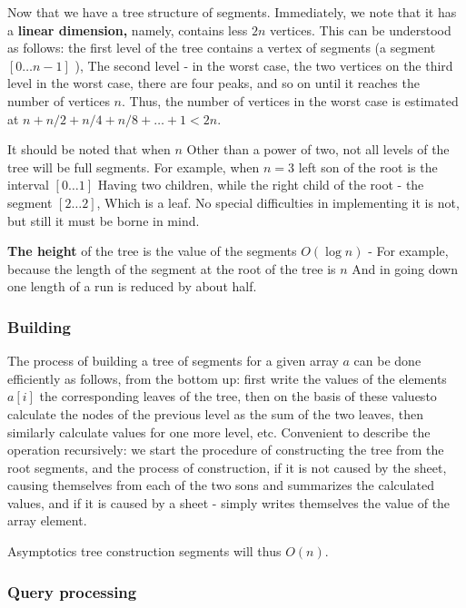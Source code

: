 Now that we have a tree structure of segments. Immediately, we note that it has a \textbf{linear dimension,} namely, contains less $2n$ vertices. This can be understood as follows: the first level of the tree contains a vertex of segments (a segment $[0 \ldots n-1]$ ), The second level - in the worst case, the two vertices on the third level in the worst case, there are four peaks, and so on until it reaches the number of vertices $n$. Thus, the number of vertices in the worst case is estimated at $n + n / 2 + n / 4 + n / 8 + \ldots + 1 <2n$.

It should be noted that when $n$ Other than a power of two, not all levels of the tree will be full segments. For example, when $n = 3$ left son of the root is the interval $[0 \ldots 1]$ Having two children, while the right child of the root - the segment $[2 \ldots 2]$, Which is a leaf. No special difficulties in implementing it is not, but still it must be borne in mind.

\textbf{The height} of the tree is the value of the segments $O (\log n)$ - For example, because the length of the segment at the root of the tree is $n$ And in going down one length of a run is reduced by about half.

\subsubsection{ Building }

The process of building a tree of segments for a given array $a$ can be done efficiently as follows, from the bottom up: first write the values ​​of the elements $a [i]$ the corresponding leaves of the tree, then on the basis of these values ​​to calculate the nodes of the previous level as the sum of the two leaves, then similarly calculate values ​​for one more level, etc. Convenient to describe the operation recursively: we start the procedure of constructing the tree from the root segments, and the process of construction, if it is not caused by the sheet, causing themselves from each of the two sons and summarizes the calculated values, and if it is caused by a sheet - simply writes themselves the value of the array element.

Asymptotics tree construction segments will thus $O (n)$.

\subsubsection{ Query processing }

